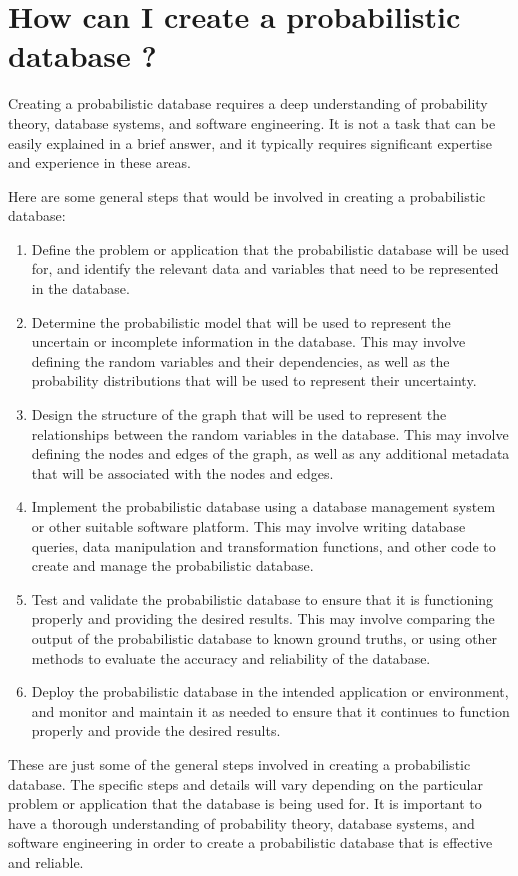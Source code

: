 \chapter{ How can I create a probabilistic database ? }

Creating a probabilistic database requires a deep understanding of probability theory, database systems, and software engineering. It is not a task that can be easily explained in a brief answer, and it typically requires significant expertise and experience in these areas.

\vspace{1cm}
Here are some general steps that would be involved in creating a probabilistic database:

\begin{enumerate}
	\item Define the problem or application that the probabilistic database will be used for, and identify the relevant data and variables that need to be represented in the database.
	
	\item Determine the probabilistic model that will be used to represent the uncertain or incomplete information in the database. This may involve defining the random variables and their dependencies, as well as the probability distributions that will be used to represent their uncertainty.
	
	\item Design the structure of the graph that will be used to represent the relationships between the random variables in the database. This may involve defining the nodes and edges of the graph, as well as any additional metadata that will be associated with the nodes and edges.
	
	\item Implement the probabilistic database using a database management system or other suitable software platform. This may involve writing database queries, data manipulation and transformation functions, and other code to create and manage the probabilistic database.
	
	\item Test and validate the probabilistic database to ensure that it is functioning properly and providing the desired results. This may involve comparing the output of the probabilistic database to known ground truths, or using other methods to evaluate the accuracy and reliability of the database.
	
	\item  Deploy the probabilistic database in the intended application or environment, and monitor and maintain it as needed to ensure that it continues to function properly and provide the desired results.
	
\end{enumerate}


These are just some of the general steps involved in creating a probabilistic database. The specific steps and details will vary depending on the particular problem or application that the database is being used for. It is important to have a thorough understanding of probability theory, database systems, and software engineering in order to create a probabilistic database that is effective and reliable.
